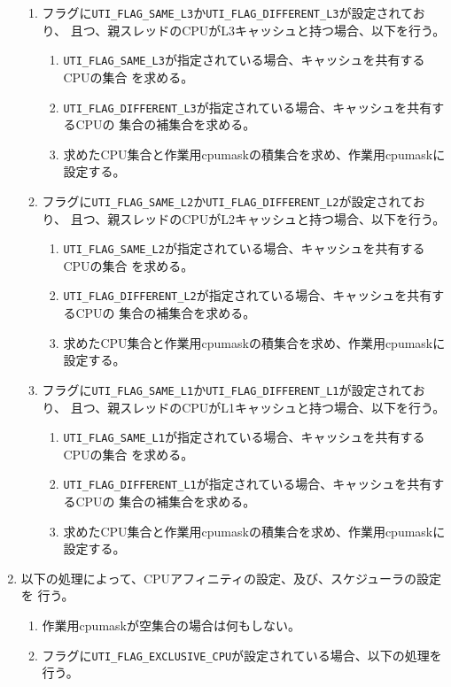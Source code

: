 \documentclass[twoside,11pt,fleqn]{book}
\begin{document}
\begin{enumerate}
\begin{enumerate}
\item フラグに\texttt{UTI\_FLAG\_SAME\_L3}か\texttt{UTI\_FLAG\_DIFFERENT\_L3}が設定されており、
且つ、親スレッドのCPUがL3キャッシュと持つ場合、以下を行う。
\begin{enumerate}
\item \texttt{UTI\_FLAG\_SAME\_L3}が指定されている場合、キャッシュを共有するCPUの集合
を求める。
\item \texttt{UTI\_FLAG\_DIFFERENT\_L3}が指定されている場合、キャッシュを共有するCPUの
集合の補集合を求める。
\item 求めたCPU集合と作業用cpumaskの積集合を求め、作業用cpumaskに設定する。
\end{enumerate}
\item フラグに\texttt{UTI\_FLAG\_SAME\_L2}か\texttt{UTI\_FLAG\_DIFFERENT\_L2}が設定されており、
且つ、親スレッドのCPUがL2キャッシュと持つ場合、以下を行う。
\begin{enumerate}
\item \texttt{UTI\_FLAG\_SAME\_L2}が指定されている場合、キャッシュを共有するCPUの集合
を求める。
\item \texttt{UTI\_FLAG\_DIFFERENT\_L2}が指定されている場合、キャッシュを共有するCPUの
集合の補集合を求める。
\item 求めたCPU集合と作業用cpumaskの積集合を求め、作業用cpumaskに設定する。
\end{enumerate}
\item フラグに\texttt{UTI\_FLAG\_SAME\_L1}か\texttt{UTI\_FLAG\_DIFFERENT\_L1}が設定されており、
且つ、親スレッドのCPUがL1キャッシュと持つ場合、以下を行う。
\begin{enumerate}
\item \texttt{UTI\_FLAG\_SAME\_L1}が指定されている場合、キャッシュを共有するCPUの集合
を求める。
\item \texttt{UTI\_FLAG\_DIFFERENT\_L1}が指定されている場合、キャッシュを共有するCPUの
集合の補集合を求める。
\item 求めたCPU集合と作業用cpumaskの積集合を求め、作業用cpumaskに設定する。
\end{enumerate}
\end{enumerate}
\item 以下の処理によって、CPUアフィニティの設定、及び、スケジューラの設定を
行う。
\begin{enumerate}
\item 作業用cpumaskが空集合の場合は何もしない。
\item フラグに\texttt{UTI\_FLAG\_EXCLUSIVE\_CPU}が設定されている場合、以下の処理を
行う。
\begin{enumerate}

\end{enumerate}
\end{enumerate}
\end{enumerate}
\end{document}
